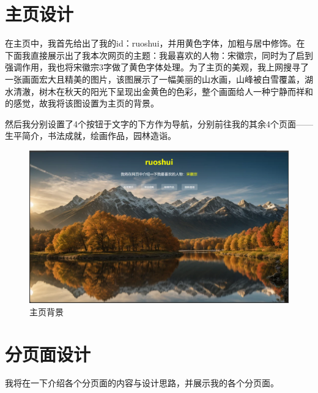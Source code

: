 \documentclass[supercite]{Experimental_Report}
\theoremstyle{definition}
\begin{document}
\section{主页设计}
在主页中，我首先给出了我的id：ruoshui，并用黄色字体，加粗与居中修饰。在下面我直接展示出了我本次网页的主题：我最喜欢的人物：宋徽宗，同时为了启到强调作用，我也将宋徽宗3字做了黄色字体处理。为了主页的美观，我上网搜寻了一张画面宏大且精美的图片，该图展示了一幅美丽的山水画，山峰被白雪覆盖，湖水清澈，树木在秋天的阳光下呈现出金黄色的色彩，整个画面给人一种宁静而祥和的感觉，故我将该图设置为主页的背景。
\par 然后我分别设置了4个按钮于文字的下方作为导航，分别前往我的其余4个页面——生平简介，书法成就，绘画作品，园林造诣。
\begin{figure}[H]
    \centering
    \includegraphics[width=1\linewidth]{./images/主页面.png}
    \caption{主页背景}
    \label{fig:enter-label}
\end{figure}

\newpage

\section{分页面设计}

我将在一下介绍各个分页面的内容与设计思路，并展示我的各个分页面。
\end{document}
